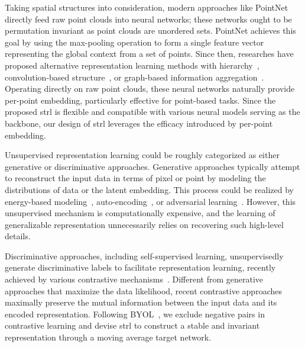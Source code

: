 \documentclass[10pt,twocolumn,letterpaper]{article}
\makeatletter
\renewcommand{\paragraph}{\@startsection{paragraph}{4}{\z@}{0ex \@plus 0ex \@minus 0ex}{-1em}{\hskip\parindent\normalfont\normalsize\bfseries}}
\makeatother
\begin{document}
Taking spatial structures into consideration, modern approaches like PointNet~\cite{qi2017pointnet} directly feed raw point clouds into neural networks; these networks ought to be permutation invariant as point clouds are unordered sets. PointNet achieves this goal by using the max-pooling operation to form a single feature vector representing the global context from a set of points. Since then, researches have proposed alternative representation learning methods with hierarchy~\cite{qi2017pointnet++,klokov2017escape,gadelha2018multiresolution}, convolution-based structure~\cite{hua2018pointwise,xu2018spidercnn,li2018pointcnn,su2018splatnet,zhang2019shellnet,wu2019pointconv,thomas2019kpconv}, or graph-based information aggregation~\cite{gadelha2018multiresolution,verma2018feastnet,shen2018mining,wang2019dynamic}. Operating directly on raw point clouds, these neural networks naturally provide per-point embedding, particularly effective for point-based tasks. Since the proposed \ac{strl} is flexible and compatible with various neural models serving as the backbone, our design of \ac{strl} leverages the efficacy introduced by per-point embedding.


\paragraph{Unsupervised Representation Learning}

Unsupervised representation learning could be roughly categorized as either generative or discriminative approaches. Generative approaches typically attempt to reconstruct the input data in terms of pixel or point by modeling the distributions of data or the latent embedding. This process could be realized by energy-based modeling~\cite{lecun2006tutorial,ngiam2011learning,xie2016theory,gao2018learning,kumar2019maximum}, auto-encoding~\cite{vincent2008extracting,kingma2013auto,bengio2013generalized}, or adversarial learning~\cite{goodfellow2014generative}. However, this unsupervised mechanism is computationally expensive, and the learning of generalizable representation unnecessarily relies on recovering such high-level details.

Discriminative approaches, including self-supervised learning, unsupervisedly generate discriminative labels to facilitate representation learning, recently achieved by various contrastive mechanisms~\cite{he2020momentum,oord2018representation,hjelm2018learning,henaff2019data,bachman2019learning,tian2019contrastive,tian2020makes}. Different from generative approaches that maximize the data likelihood, recent contrastive approaches maximally preserve the mutual information between the input data and its encoded representation. Following BYOL~\cite{grill2020bootstrap}, we exclude negative pairs in contrastive learning and devise \ac{strl} to construct a stable and invariant representation through a moving average target network.
\end{document}
